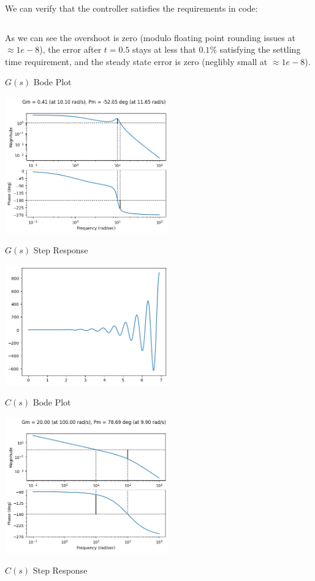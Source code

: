 \documentclass[11pt]{article}
\begin{document}
We can verify that the controller satisfies the requirements in code:

\inputminted{python}{a4_2.py}

As we can see the overshoot is zero (modulo floating point rounding issues at $\approx 1e-8$), the error after $t = 0.5$ stays at less that $0.1\%$ satisfying the settling time requirement, and the steady state error is zero (neglibly small at $\approx 1e-8$).

$G(s)$ Bode Plot

\includegraphics[width=200pt]{a4_6.png}
  
$G(s)$ Step Response

\includegraphics[width=200pt]{a4_7.png}

$C(s)$ Bode Plot

\includegraphics[width=200pt]{a4_8.png}
  
$C(s)$ Step Response
\end{document}
